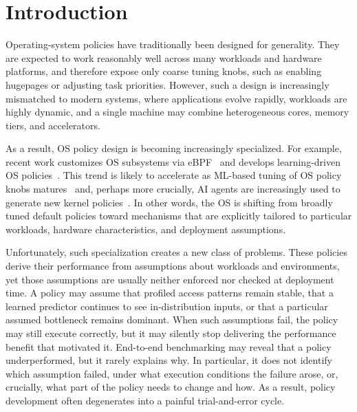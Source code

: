 \section{Introduction}\label{sec:introduction}

Operating-system policies have traditionally been designed for generality. They are expected to work reasonably well across many workloads and hardware platforms, and therefore expose only coarse tuning knobs, such as enabling hugepages or adjusting task priorities. However, such a design is increasingly mismatched to modern systems, where applications evolve rapidly, workloads are highly dynamic, and a single machine may combine heterogeneous cores, memory tiers, and accelerators.

As a result, OS policy design is becoming increasingly specialized. For example, recent work customizes OS subsystems via eBPF~\cite{kflex-sosp24,cache-ext-sosp25,sched-ext,meta-lavd} and develops learning-driven OS policies~\cite{heimdall-eurosys25,orca-sigcomm20,kml-tos23,kleio-hpdc19}. This trend is likely to accelerate as ML-based tuning of OS policy knobs matures~\cite{tuning-pacmi25,agentic-tuning-ml4sys25} and, perhaps more crucially, AI agents are increasingly used to generate new kernel policies~\cite{policysmith-hotnets25,glia-arxiv25,barbarians25,vulcan-arxiv25,agentic-os-ml4sys25}. In other words, the OS is shifting from broadly tuned default policies toward mechanisms that are explicitly tailored to particular workloads, hardware characteristics, and deployment assumptions.

Unfortunately, such specialization creates a new class of problems. These policies derive their performance from assumptions about workloads and environments, yet those assumptions are usually neither enforced nor checked at deployment time. A policy may assume that profiled access patterns remain stable, that a learned predictor continues to see in-distribution inputs, or that a particular assumed bottleneck remains dominant.  When such assumptions fail, the policy may still execute correctly, but it may silently stop delivering the performance benefit that motivated it. End-to-end benchmarking may reveal that a policy underperformed, but it rarely explains why. In particular, it does not identify which assumption failed, under what execution conditions the failure arose, or, crucially, what part of the policy needs to change and how. As a result, policy development often degenerates into a painful trial-and-error cycle.

